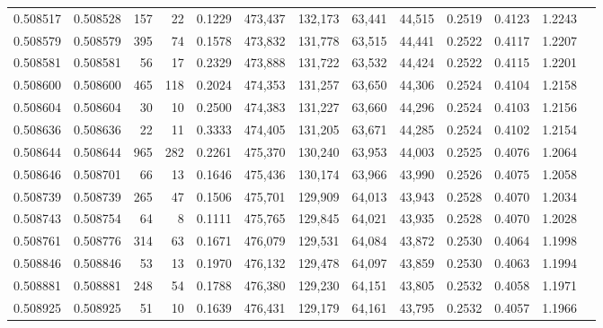 \begin{tabular}{rrrrrrrrrrrrr}
0.508517 & 0.508528 &   157 &    22 &                                     0.1229 & 473,437 & 132,173 &  63,441 &  44,515 & 0.2519 & 0.4123 & 1.2243 \\
0.508579 & 0.508579 &   395 &    74 &                                     0.1578 & 473,832 & 131,778 &  63,515 &  44,441 & 0.2522 & 0.4117 & 1.2207 \\
0.508581 & 0.508581 &    56 &    17 &                                     0.2329 & 473,888 & 131,722 &  63,532 &  44,424 & 0.2522 & 0.4115 & 1.2201 \\
0.508600 & 0.508600 &   465 &   118 &                                     0.2024 & 474,353 & 131,257 &  63,650 &  44,306 & 0.2524 & 0.4104 & 1.2158 \\
0.508604 & 0.508604 &    30 &    10 &                                     0.2500 & 474,383 & 131,227 &  63,660 &  44,296 & 0.2524 & 0.4103 & 1.2156 \\
0.508636 & 0.508636 &    22 &    11 &                                     0.3333 & 474,405 & 131,205 &  63,671 &  44,285 & 0.2524 & 0.4102 & 1.2154 \\
0.508644 & 0.508644 &   965 &   282 &                                     0.2261 & 475,370 & 130,240 &  63,953 &  44,003 & 0.2525 & 0.4076 & 1.2064 \\
0.508646 & 0.508701 &    66 &    13 &                                     0.1646 & 475,436 & 130,174 &  63,966 &  43,990 & 0.2526 & 0.4075 & 1.2058 \\
0.508739 & 0.508739 &   265 &    47 &                                     0.1506 & 475,701 & 129,909 &  64,013 &  43,943 & 0.2528 & 0.4070 & 1.2034 \\
0.508743 & 0.508754 &    64 &     8 &                                     0.1111 & 475,765 & 129,845 &  64,021 &  43,935 & 0.2528 & 0.4070 & 1.2028 \\
0.508761 & 0.508776 &   314 &    63 &                                     0.1671 & 476,079 & 129,531 &  64,084 &  43,872 & 0.2530 & 0.4064 & 1.1998 \\
0.508846 & 0.508846 &    53 &    13 &                                     0.1970 & 476,132 & 129,478 &  64,097 &  43,859 & 0.2530 & 0.4063 & 1.1994 \\
0.508881 & 0.508881 &   248 &    54 &                                     0.1788 & 476,380 & 129,230 &  64,151 &  43,805 & 0.2532 & 0.4058 & 1.1971 \\
0.508925 & 0.508925 &    51 &    10 &                                     0.1639 & 476,431 & 129,179 &  64,161 &  43,795 & 0.2532 & 0.4057 & 1.1966 \\

\end{tabular}
